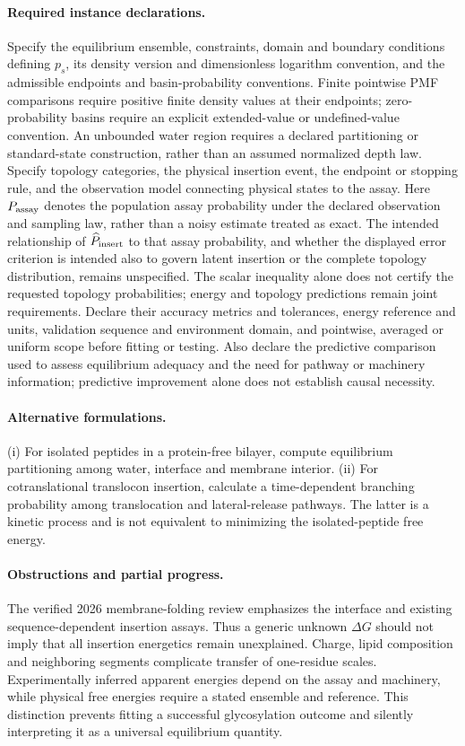 \documentclass[11pt]{article}
\begin{document}
\paragraph{Required instance declarations.} Specify the equilibrium ensemble, constraints, domain and boundary conditions defining $p_s$, its density version and dimensionless logarithm convention, and the admissible endpoints and basin-probability conventions. Finite pointwise PMF comparisons require positive finite density values at their endpoints; zero-probability basins require an explicit extended-value or undefined-value convention. An unbounded water region requires a declared partitioning or standard-state construction, rather than an assumed normalized depth law. Specify topology categories, the physical insertion event, the endpoint or stopping rule, and the observation model connecting physical states to the assay. Here $P_{\rm assay}$ denotes the population assay probability under the declared observation and sampling law, rather than a noisy estimate treated as exact. The intended relationship of $\widehat P_{\rm insert}$ to that assay probability, and whether the displayed error criterion is intended also to govern latent insertion or the complete topology distribution, remains unspecified. The scalar inequality alone does not certify the requested topology probabilities; energy and topology predictions remain joint requirements. Declare their accuracy metrics and tolerances, energy reference and units, validation sequence and environment domain, and pointwise, averaged or uniform scope before fitting or testing. Also declare the predictive comparison used to assess equilibrium adequacy and the need for pathway or machinery information; predictive improvement alone does not establish causal necessity.

\paragraph{Alternative formulations.} (i) For isolated peptides in a protein-free bilayer, compute equilibrium partitioning among water, interface and membrane interior. (ii) For cotranslational translocon insertion, calculate a time-dependent branching probability among translocation and lateral-release pathways. The latter is a kinetic process and is not equivalent to minimizing the isolated-peptide free energy.
\paragraph{Obstructions and partial progress.} The verified 2026 membrane-folding review emphasizes the interface and existing sequence-dependent insertion assays. Thus a generic unknown $\Delta G$ should not imply that all insertion energetics remain unexplained. Charge, lipid composition and neighboring segments complicate transfer of one-residue scales. Experimentally inferred apparent energies depend on the assay and machinery, while physical free energies require a stated ensemble and reference. This distinction prevents fitting a successful glycosylation outcome and silently interpreting it as a universal equilibrium quantity.
\end{document}
